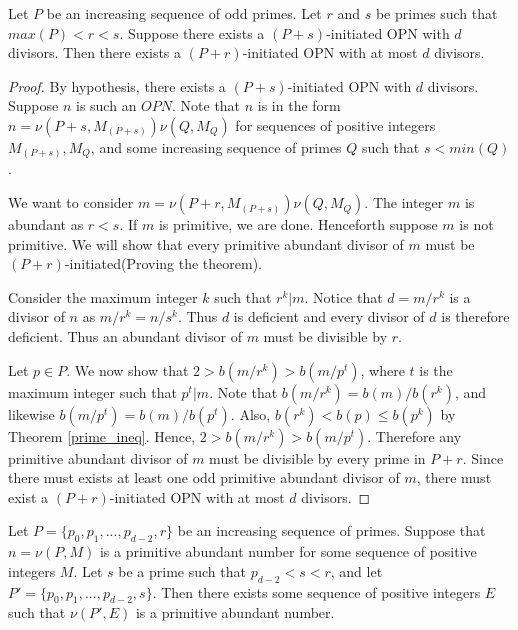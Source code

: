 \documentclass[../paper.tex]{subfiles}
\begin{document}


\begin{theorem}
\label{Divisibility}
Let $P$ be an increasing sequence of odd primes. Let $r$ and $s$ be
primes such that $max(P) < r < s$. Suppose there exists a $(P +
s)$-initiated OPN with $d$ divisors. Then there exists a $(P +
r)$-initiated OPN with at most $d$ divisors. 
\end{theorem}

\begin{proof}
By hypothesis, there exists a $(P + s)$-initiated OPN with $d$ divisors.
Suppose $n$ is such an $OPN$. Note that $n$ is in the form $n =
\nu(P + s, M_{(P + s)}) \nu(Q, M_Q)$ for sequences of positive 
integers $M_{(P + s)}, M_Q$, and some increasing sequence of
primes $Q$ such that $s < min(Q)$.

  We want to consider $m = \nu(P + r, M_{(P + s)}) \nu(Q, M_Q)$. 
The integer $m$ is abundant as $r < s$. If $m$ is primitive,
we are done. Henceforth suppose $m$ is not primitive. 
We will show that every primitive abundant divisor of $m$ must be 
$(P + r)$-initiated(Proving the theorem).

  Consider the maximum integer
$k$ such that $r^k | m$. Notice that $d = m / r^k$ is a divisor of $n$
as $m / r^k = n / s^k$. Thus $d$ is deficient and every divisor of
$d$ is therefore deficient. Thus an abundant divisor of $m$ must
be divisible by $r$.

Let $p \in P$.  We now show that $2 > b(m / r^k) > b(m / p^t)$, 
where $t$ is the maximum integer such that $p^t | m$. Note that
$b(m / r^k) = b(m) / b(r^k)$, and likewise $b(m / p^t) = b(m) /
b(p^t)$. Also, $b(r^k) < b(p) \leq b(p^k)$ by Theorem {\ref{prime_ineq}}. 
Hence, $2 > b(m / r^k) > b(m / p^t)$. Therefore any primitive
abundant divisor of $m$ must be divisible by every prime in 
$P + r$. Since there must exists at least one odd primitive 
abundant divisor of $m$, there must exist a $(P + r)$-initiated 
OPN with at most $d$ divisors.
\end{proof}

\begin{coro}\label{Continuity}
Let $P = \{p_0, p_1, ..., p_{d-2}, r\}$ be an increasing sequence 
of primes. Suppose that $n = \nu(P, M)$ is a primitive abundant 
number for some sequence of positive integers $M$. Let $s$ be a 
prime such that $p_{d-2} < s < r$, and let $P' = \{p_0, p_1,...,
p_{d-2}, s\}$. Then there exists some sequence of positive integers
$E$ such that $\nu(P', E)$ is a primitive abundant number.
\end{coro}
\end{document}
